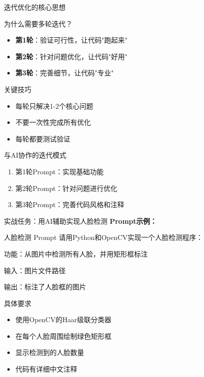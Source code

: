\begin{frame}{迭代优化的核心思想}
	\begin{block}{为什么需要多轮迭代？}
		\begin{itemize}
			\item \textbf{第1轮}：验证可行性，让代码"跑起来"
			\item \textbf{第2轮}：针对问题优化，让代码"好用"
			\item \textbf{第3轮}：完善细节，让代码"专业"
		\end{itemize}
	\end{block}

	\begin{alertblock}{关键技巧}
		\begin{itemize}
			\item 每轮只解决1-2个核心问题
			\item 不要一次性完成所有优化
			\item 每轮都要测试验证
		\end{itemize}
	\end{alertblock}

	\vspace{0.3cm}

	\begin{block}{与AI协作的迭代模式}
		\begin{enumerate}
			\item 第1轮Prompt：实现基础功能
			\item 第2轮Prompt：针对问题进行优化
			\item 第3轮Prompt：完善代码风格和注释
		\end{enumerate}
	\end{block}
\end{frame}


\begin{frame}[fragile]{实战任务：用AI辅助实现人脸检测}
	\textbf{Prompt示例：}

	\begin{exampleblock}{人脸检测 Prompt}
		请用Python和OpenCV实现一个人脸检测程序：

		功能：从图片中检测所有人脸，并用矩形框标注

		输入：图片文件路径

		输出：标注了人脸框的图片
	\end{exampleblock}

	\vspace{0.3cm}

	\begin{block}{具体要求}
		\begin{itemize}
			\item 使用OpenCV的Haar级联分类器
			\item 在每个人脸周围绘制绿色矩形框
			\item 显示检测到的人脸数量
			\item 代码有详细中文注释
		\end{itemize}
	\end{block}
\end{frame}

